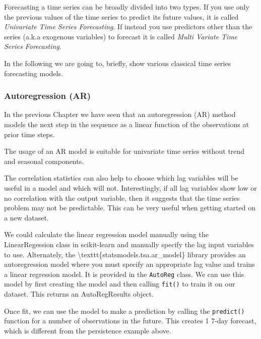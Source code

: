 \documentclass[11pt]{article}
\begin{document}
Forecasting a time series can be broadly divided into two types. If you
use only the previous values of the time series to predict its future
values, it is called \emph{Univariate Time Series Forecasting}. If
instead you use predictors other than the series (a.k.a exogenous
variables) to forecast it is called
\emph{Multi Variate Time Series Forecasting}.

In the following we are going to, briefly, show various classical time
series forecasting models.

\hypertarget{autoregression-ar}{%
\subsubsection{Autoregression (AR)}\label{autoregression-ar}}

In the previous Chapter we have seen that an autoregression (AR) method
models the next step in the sequence as a linear function of the
observations at prior time steps.

The usage of an AR model is suitable for univariate time series without
trend and seasonal components.

The correlation statistics can also help to choose which lag variables
will be useful in a model and which will not. Interestingly, if all lag
variables show low or no correlation with the output variable, then it
suggests that the time series problem may not be predictable. This can
be very useful when getting started on a new dataset.

We could calculate the linear regression model manually using the
LinearRegession class in scikit-learn and manually specify the lag input
variables to use. Alternately, the
\textbackslash{}texttt\{statsmodels.tsa.ar\_model\} library provides an
autoregression model where you must specify an appropriate lag value and
trains a linear regression model. It is provided in the \texttt{AutoReg}
class. We can use this model by first creating the model and then
calling \texttt{fit()} to train it on our dataset. This returns an
AutoRegResults object.

Once fit, we can use the model to make a prediction by calling the
\texttt{predict()} function for a number of observations in the future.
This creates 1 7-day forecast, which is different from the persistence
example above.
\end{document}

